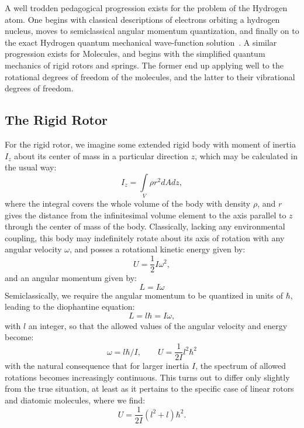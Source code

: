 A well trodden pedagogical progression exists for the problem of the Hydrogen atom. 
One begins with classical descriptions of electrons orbiting a hydrogen nucleus, moves to semiclassical angular momentum quantization, and finally on to the exact Hydrogen quantum mechanical wave-function solution~\citep[Sec.~4.2]{Griffiths2018}. 
A similar progression exists for Molecules, and begins with the simplified quantum mechanics of rigid rotors and springs.
The former end up applying well to the rotational degrees of freedom of the molecules, and the latter to their vibrational degrees of freedom.

\subsection{The Rigid Rotor}

For the rigid rotor, we imagine some extended rigid body with moment of inertia $I_z$ about its center of mass in a particular direction $z$, which may be calculated in the usual way:
\begin{equation}
I_z = \int\limits_V\rho r^2 dAdz,\label{izsimp}
\end{equation}
where the integral covers the whole volume of the body with density $\rho$, and $r$ gives the distance from the infinitesimal volume element to the axis parallel to $z$ through the center of mass of the body.
Classically, lacking any environmental coupling, this body may indefinitely rotate about its axis of rotation with any angular velocity $\omega$, and posses a rotational kinetic energy given by:
\begin{equation}
U=\frac{1}{2}I\omega^2,
\end{equation}
and an angular momentum given by:
\begin{equation}
L= I\omega
\end{equation}
Semiclassically, we require the angular momentum to be quantized in units of $\hbar$, leading to the diophantine equation:
\begin{equation}
L = l\hbar = I\omega,
\end{equation}
with $l$ an integer, so that the allowed values of the angular velocity and energy become:
\begin{equation}
\omega = l\hbar/I, \qquad U = \frac{1}{2I}l^2\hbar^2
\end{equation}
with the natural consequence that for larger inertia $I$, the spectrum of allowed rotations becomes increasingly continuous.
This turns out to differ only slightly from the true situation, at least as it pertains to the specific case of linear rotors and diatomic molecules, where we find:
\begin{equation}
U = \frac{1}{2I}(l^2 + l)\hbar^2.
\end{equation}

